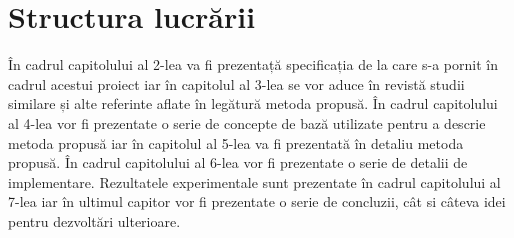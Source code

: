 \section{Structura lucrării}

În cadrul capitolului al 2-lea va fi prezentață specificația de la care s-a pornit în cadrul acestui proiect iar în capitolul al 3-lea se vor aduce în revistă studii similare și alte referinte aflate în legătură metoda propusă. În cadrul capitolului al 4-lea vor fi prezentate o serie de concepte de bază utilizate pentru a descrie metoda propusă iar în capitolul al 5-lea va fi prezentată în detaliu metoda propusă. În cadrul capitolului al 6-lea vor fi prezentate o serie de detalii de implementare. Rezultatele experimentale sunt prezentate în cadrul capitolului al 7-lea iar în ultimul capitor vor fi prezentate o serie de concluzii, cât si câteva idei pentru dezvoltări ulterioare. 